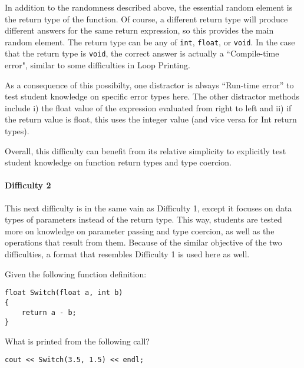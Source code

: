 \documentclass{article}
\begin{document}
In addition to the randomness described above, the essential random element is the return type of the function. Of course, a different return type will produce different answers for the same return expression, so this provides the main random element. The return type can be any of  \texttt{int}, \texttt{float}, or \texttt{void}. In the case that the return type is \texttt{void}, the correct
answer is actually a ``Compile-time error", similar to some difficulties in Loop Printing. 

As a consequence of this possibilty, one distractor is always ``Run-time error'' to test student knowledge on specific error types here. The other distractor methods include i) the float value
of the expression evaluated from right to left and ii) if the return value is float, this uses the integer value (and vice versa for Int return types).

Overall, this difficulty can benefit from its relative simplicity to explicitly test student knowledge on function return types and type coercion.

\paragraph{Difficulty 2} \hfill \par

This next difficulty is in the same vain as Difficulty 1, except it focuses on data types of parameters instead of the return type. This way, students are tested more on knowledge on parameter passing and type coercion, as well as the operations that result from them.
Because of the similar objective of the two difficulties, a format that resembles Difficulty 1 is used here as well.
\hfill \par \hfill \par

\noindent
\begin{VerbCM}
Given the following function definition:
\end{VerbCM}
\begin{lstlisting}
float Switch(float a, int b)
{
    return a - b;
}
\end{lstlisting}
\begin{VerbCM}
What is printed from the following call?
\end{VerbCM}
\begin{lstlisting}[caption={\textbf{Functions} Difficulty 2 Example}, label=lst-functions_2]
cout << Switch(3.5, 1.5) << endl;
\end{lstlisting}
\end{document}
